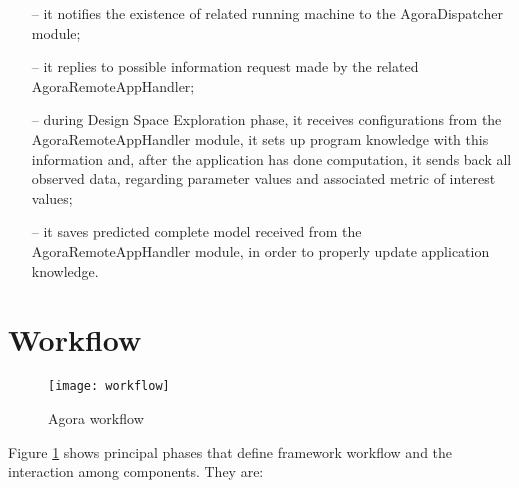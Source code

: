 \begin{enumerate}
\begin{itemize}
		\item [--] it notifies the existence of related running machine to the AgoraDispatcher module;

		\item [--] it replies to possible information request made by the related AgoraRemoteAppHandler;

		\item [--] during Design Space Exploration phase, it receives configurations from the AgoraRemoteAppHandler module, it sets up program knowledge with this information and, after the application has done computation, it sends back all observed data, regarding parameter values and associated metric of interest values;

		\item [--] it saves predicted complete model received from the AgoraRemoteAppHandler module, in order to properly update application knowledge.
	\end{itemize}

\end{enumerate}



\section{Workflow}

\begin{figure}[htb]

    \centering
    \texttt{[image: workflow]}
    \caption{Agora workflow}
    \label{fig::work}
    
\end{figure}

Figure \ref{fig::work} shows principal phases that define framework workflow and the interaction among components. They are:

